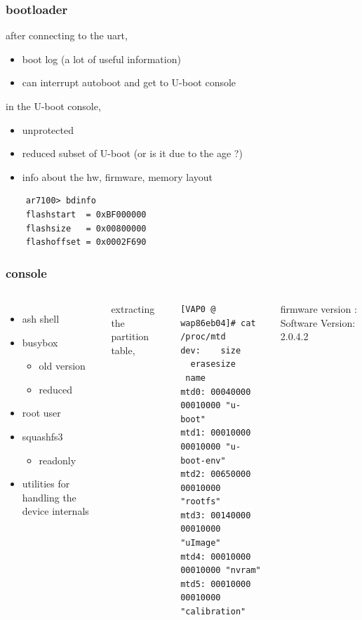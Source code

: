\documentclass{beamer}
\begin{document}
\begin{frame}[fragile]
	\frametitle{bootloader}	
	after connecting to the uart,
	\begin{itemize}
		\item boot log (a lot of useful information)
		\item can interrupt autoboot and get to U-boot console
	\end{itemize}
	in the U-boot console,
	\begin{itemize}
		\item unprotected
		\item reduced subset of U-boot (or is it due to the age ?)
		\item info about the hw, firmware, \alert{memory layout}
	\end{itemize}
	\begin{verbatim}
	ar7100> bdinfo
	flashstart  = 0xBF000000
	flashsize   = 0x00800000
	flashoffset = 0x0002F690
	\end{verbatim}
\end{frame}

\begin{frame}[fragile]
	\frametitle{console}
	\begin{columns}
		\begin{itemize}
			\item ash shell
			\item busybox
				\begin{itemize}
					\item old version
					\item reduced
				\end{itemize}
			\item root user
			\item squashfs3
				\begin{itemize}
					\item readonly	
				\end{itemize}
			\item utilities for handling the device internals

		\end{itemize}
		extracting the partition table,
		\begin{verbatim}
[VAP0 @ wap86eb04]# cat /proc/mtd    
dev:    size   erasesize  name  
mtd0: 00040000 00010000 "u-boot"  
mtd1: 00010000 00010000 "u-boot-env"  
mtd2: 00650000 00010000 "rootfs"  
mtd3: 00140000 00010000 "uImage"  
mtd4: 00010000 00010000 "nvram"  
mtd5: 00010000 00010000 "calibration"	
		\end{verbatim}
		firmware version : Software Version: 2.0.4.2
	\end{columns}
\end{frame}
\end{document}
